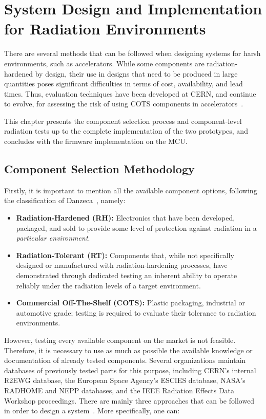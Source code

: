 \chapter{System Design and Implementation for Radiation Environments}
\label{chapter:system-design}
There are several methods that can be followed when designing systems for harsh environments, such as accelerators. While some components are radiation-hardened by design, their use in designs that need to be produced in large quantities poses significant difficulties in terms of cost, availability, and lead times. Thus, evaluation techniques have been developed at CERN, and continue to evolve, for assessing the risk of using COTS components in accelerators~\cite{coronetti_rha_system_level,ferraro_phd_thesis}.

This chapter presents the component selection process and component-level radiation tests up to the complete implementation of the two prototypes, and concludes with the firmware implementation on the MCU.

\section{Component Selection Methodology}
\label{section:component-selection-methodology}
Firstly, it is important to mention all the available component options, following the classification of Danzeca~\cite[slides 15--17]{danzeca2023developing}, namely:

\begin{itemize}
    \item \textbf{Radiation-Hardened (RH):} Electronics that have been developed, packaged, and sold to provide some level of protection against radiation in a \textit{particular environment}.
    \item \textbf{Radiation-Tolerant (RT):} Components that, while not specifically designed or manufactured with radiation-hardening processes, have demonstrated through dedicated testing an inherent ability to operate reliably under the radiation levels of a target environment.
    \item \textbf{Commercial Off-The-Shelf (COTS):} Plastic packaging, industrial or automotive grade; testing is required to evaluate their tolerance to radiation environments.
\end{itemize}

However, testing every available component on the market is not feasible. Therefore, it is necessary to use as much as possible the available knowledge or documentation of already tested components. Several organizations maintain databases of previously tested parts for this purpose, including CERN's internal R2EWG database, the European Space Agency's ESCIES database, NASA's RADHOME and NEPP databases, and the IEEE Radiation Effects Data Workshop proceedings.
There are mainly three approaches that can be followed in order to design a system~\cite[slide 17]{danzeca2023developing}. More specifically, one can:

